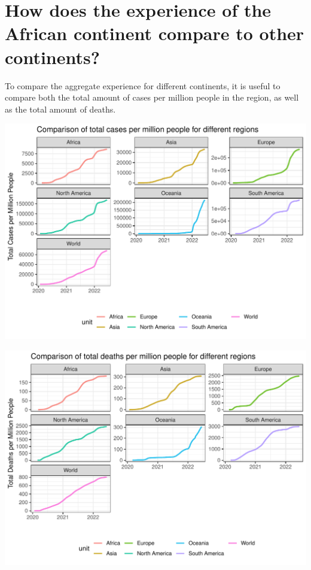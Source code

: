 \documentclass[11pt,preprint, authoryear]{elsarticle}
\let\origfigure\figure
\let\endorigfigure\endfigure
\renewenvironment{figure}[1][2] {
    \expandafter\origfigure\expandafter[H]
} {
    \endorigfigure
}
\numberwithin{equation}{section}
\numberwithin{figure}{section}
\numberwithin{table}{section}
\begin{document}
\hypertarget{how-does-the-experience-of-the-african-continent-compare-to-other-continents}{%
\section{\texorpdfstring{How does the experience of the African
continent compare to other continents?
\label{-}}{How does the experience of the African continent compare to other continents? }}\label{how-does-the-experience-of-the-african-continent-compare-to-other-continents}}

To compare the aggregate experience for different continents, it is
useful to compare both the total amount of cases per million people in
the region, as well as the total amount of deaths.~

\begin{figure}[H]

{\centering \includegraphics{Question_1_files/figure-latex/Figure1-1} 

}

\caption{\label{Figure1}}\label{fig:Figure1}
\end{figure}
\begin{figure}[H]

{\centering \includegraphics{Question_1_files/figure-latex/Figure2-1} 

}

\caption{\label{Figure1}}\label{fig:Figure2}
\end{figure}
\end{document}
